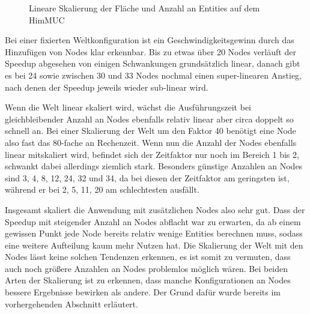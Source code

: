 \documentclass[course=erap]{aspdoc}
\begin{document}
\begin{figure}[t]
\centering
\begin{minipage}{.5\textwidth}
\centering
{}
\end{minipage}%
\begin{minipage}{.5\textwidth}
\centering
{}
\end{minipage}
\caption{Lineare Skalierung der Fläche und Anzahl an Entities auf dem HimMUC}
\label{fig:himmuc-weak-scaling}
\end{figure}

Bei einer fixierten Weltkonfiguration ist ein Geschwindigkeitsgewinn durch das Hinzufügen von Nodes klar erkennbar. Bis zu etwas über 20 Nodes verläuft der Speedup abgesehen von einigen Schwankungen grundsätzlich linear, danach gibt es bei 24 sowie zwischen 30 und 33 Nodes nochmal einen super-linearen Anstieg, nach denen der Speedup jeweils wieder sub-linear wird.

Wenn die Welt linear skaliert wird, wächst die Ausführungszeit bei gleichbleibender Anzahl an Nodes ebenfalls relativ linear aber circa doppelt so schnell an. Bei einer Skalierung der Welt um den Faktor 40 benötigt eine Node also fast das 80-fache an Rechenzeit. Wenn nun die Anzahl der Nodes ebenfalls linear mitskaliert wird, befindet sich der Zeitfaktor nur noch im Bereich 1 bis 2, schwankt dabei allerdings ziemlich stark. Besonders günstige Anzahlen an Nodes sind 3, 4, 8, 12, 24, 32 und 34, da bei diesen der Zeitfaktor am geringsten ist, während er bei 2, 5, 11, 20 am schlechtesten ausfällt.

Insgesamt skaliert die Anwendung mit zusätzlichen Nodes also sehr gut. Dass der Speedup mit steigender Anzahl an Nodes abflacht war zu erwarten, da ab einem gewissen Punkt jede Node bereits relativ wenige Entities berechnen muss, sodass eine weitere Aufteilung kaum mehr Nutzen hat. Die Skalierung der Welt mit den Nodes lässt keine solchen Tendenzen erkennen, es ist somit zu vermuten, dass auch noch größere Anzahlen an Nodes problemlos möglich wären. Bei beiden Arten der Skalierung ist zu erkennen, dass manche Konfigurationen an Nodes bessere Ergebnisse bewirken als andere. Der Grund dafür wurde bereits im vorhergehenden Abschnitt erläutert.
\end{document}
